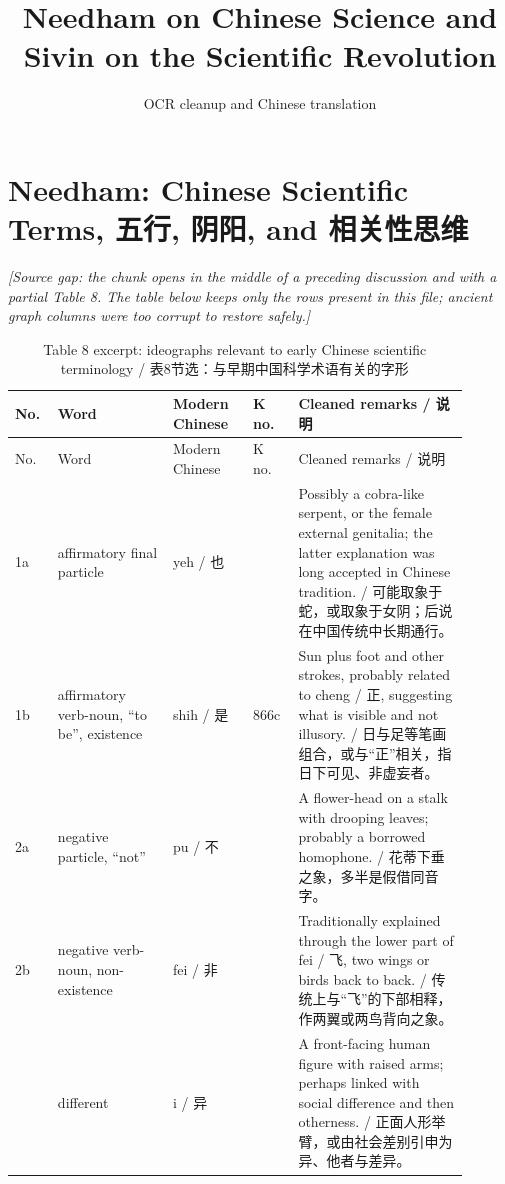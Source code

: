 \documentclass[UTF8,zihao=-4]{ctexart}
\title{Needham on Chinese Science and Sivin on the Scientific Revolution}
\author{OCR cleanup and Chinese translation}
\date{}
\newcommand{\gapnote}[1]{\par\smallskip\noindent\textit{[Source gap: #1]}\par\smallskip}
\begin{document}
\maketitle

\section*{Needham: Chinese Scientific Terms, 五行, 阴阳, and 相关性思维}

\gapnote{the chunk opens in the middle of a preceding discussion and with a partial Table 8. The table below keeps only the rows present in this file; ancient graph columns were too corrupt to restore safely.}

\begin{longtable}{>{\raggedright\arraybackslash}p{0.08\linewidth}
                  >{\raggedright\arraybackslash}p{0.23\linewidth}
                  >{\raggedright\arraybackslash}p{0.16\linewidth}
                  >{\raggedright\arraybackslash}p{0.09\linewidth}
                  >{\raggedright\arraybackslash}p{0.34\linewidth}}
\caption{Table 8 excerpt: ideographs relevant to early Chinese scientific terminology / 表8节选：与早期中国科学术语有关的字形}\\
\toprule
No. & Word & Modern Chinese & K no. & Cleaned remarks / 说明 \\
\midrule
\endfirsthead
\toprule
No. & Word & Modern Chinese & K no. & Cleaned remarks / 说明 \\
\midrule
\endhead
1a & affirmatory final particle & yeh / 也 & 4 & Possibly a cobra-like serpent, or the female external genitalia; the latter explanation was long accepted in Chinese tradition. / 可能取象于蛇，或取象于女阴；后说在中国传统中长期通行。\\
1b & affirmatory verb-noun, ``to be'', existence & shih / 是 & 866c & Sun plus foot and other strokes, probably related to cheng / 正, suggesting what is visible and not illusory. / 日与足等笔画组合，或与“正”相关，指日下可见、非虚妄者。\\
2a & negative particle, ``not'' & pu / 不 & 999 & A flower-head on a stalk with drooping leaves; probably a borrowed homophone. / 花蒂下垂之象，多半是假借同音字。\\
2b & negative verb-noun, non-existence & fei / 非 & 579 & Traditionally explained through the lower part of fei / 飞, two wings or birds back to back. / 传统上与“飞”的下部相释，作两翼或两鸟背向之象。\\
3 & different & i / 异 & 954 & A front-facing human figure with raised arms; perhaps linked with social difference and then otherness. / 正面人形举臂，或由社会差别引申为异、他者与差异。\\

\end{longtable}
\end{document}
